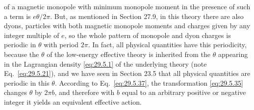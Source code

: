 of a magnetic monopole with minimum monopole moment in the presence of such
a term is \(e\theta/2\pi\). But, as mentioned in Section 27.9, in this theory
there are also dyons, particles with both magnetic monopole moments and
charges given by any integer multiple of \(e\), so the whole pattern of
monopole and dyon charges is periodic in \(\theta\) with period \(2\pi\). In
fact, all physical quantities have this periodicity, because the \(\theta\)
of the low-energy effective theory is inherited from the \(\theta\) appearing
in the Lagrangian density \eqref{eq:29.5.1} of the underlying theory (note
Eq.~\eqref{eq:29.5.21}), and we have seen in Section 23.5 that all physical
quantities are periodic in this \(\theta\). According to
Eq.~\eqref{eq:29.5.37}, the transformation \eqref{eq:29.5.35} changes
\(\theta\) by \(2\pi b\), and therefore with \(b\) equal to an arbitrary
positive or negative integer it yields an equivalent effective action.

